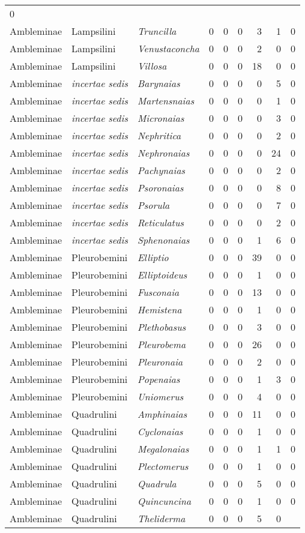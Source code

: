 \documentclass[11pt]{article}
\begin{document}
\begin{longtable}[l]{@{}lllrrrrrr@{}}
0\tabularnewline
Ambleminae & Lampsilini & \textit{Truncilla} & 0 & 0 & 0 & 3 & 1 &
0\tabularnewline
Ambleminae & Lampsilini & \textit{Venustaconcha} & 0 & 0 & 0 & 2 & 0 &
0\tabularnewline
Ambleminae & Lampsilini & \textit{Villosa} & 0 & 0 & 0 & 18 & 0 &
0\tabularnewline
Ambleminae & \textit{incertae sedis} & \textit{Barynaias} & 0 & 0 & 0 & 0 &
5 & 0\tabularnewline
Ambleminae & \textit{incertae sedis} & \textit{Martensnaias} & 0 & 0 & 0 & 0
& 1 & 0\tabularnewline
Ambleminae & \textit{incertae sedis} & \textit{Micronaias} & 0 & 0 & 0 & 0 &
3 & 0\tabularnewline
Ambleminae & \textit{incertae sedis} & \textit{Nephritica} & 0 & 0 & 0 & 0 &
2 & 0\tabularnewline
Ambleminae & \textit{incertae sedis} & \textit{Nephronaias} & 0 & 0 & 0 & 0
& 24 & 0\tabularnewline
Ambleminae & \textit{incertae sedis} & \textit{Pachynaias} & 0 & 0 & 0 & 0 &
2 & 0\tabularnewline
Ambleminae & \textit{incertae sedis} & \textit{Psoronaias} & 0 & 0 & 0 & 0 &
8 & 0\tabularnewline
Ambleminae & \textit{incertae sedis} & \textit{Psorula} & 0 & 0 & 0 & 0 & 7
& 0\tabularnewline
Ambleminae & \textit{incertae sedis} & \textit{Reticulatus} & 0 & 0 & 0 & 0
& 2 & 0\tabularnewline
Ambleminae & \textit{incertae sedis} & \textit{Sphenonaias} & 0 & 0 & 0 & 1
& 6 & 0\tabularnewline
Ambleminae & Pleurobemini & \textit{Elliptio} & 0 & 0 & 0 & 39 & 0 &
0\tabularnewline
Ambleminae & Pleurobemini & \textit{Elliptoideus} & 0 & 0 & 0 & 1 & 0 &
0\tabularnewline
Ambleminae & Pleurobemini & \textit{Fusconaia} & 0 & 0 & 0 & 13 & 0 &
0\tabularnewline
Ambleminae & Pleurobemini & \textit{Hemistena} & 0 & 0 & 0 & 1 & 0 &
0\tabularnewline
Ambleminae & Pleurobemini & \textit{Plethobasus} & 0 & 0 & 0 & 3 & 0 &
0\tabularnewline
Ambleminae & Pleurobemini & \textit{Pleurobema} & 0 & 0 & 0 & 26 & 0 &
0\tabularnewline
Ambleminae & Pleurobemini & \textit{Pleuronaia} & 0 & 0 & 0 & 2 & 0 &
0\tabularnewline
Ambleminae & Pleurobemini & \textit{Popenaias} & 0 & 0 & 0 & 1 & 3 &
0\tabularnewline
Ambleminae & Pleurobemini & \textit{Uniomerus} & 0 & 0 & 0 & 4 & 0 &
0\tabularnewline
Ambleminae & Quadrulini & \textit{Amphinaias} & 0 & 0 & 0 & 11 & 0 &
0\tabularnewline
Ambleminae & Quadrulini & \textit{Cyclonaias} & 0 & 0 & 0 & 1 & 0 &
0\tabularnewline
Ambleminae & Quadrulini & \textit{Megalonaias} & 0 & 0 & 0 & 1 & 1 &
0\tabularnewline
Ambleminae & Quadrulini & \textit{Plectomerus} & 0 & 0 & 0 & 1 & 0 &
0\tabularnewline
Ambleminae & Quadrulini & \textit{Quadrula} & 0 & 0 & 0 & 5 & 0 &
0\tabularnewline
Ambleminae & Quadrulini & \textit{Quincuncina} & 0 & 0 & 0 & 1 & 0 &
0\tabularnewline
Ambleminae & Quadrulini & \textit{Theliderma} & 0 & 0 & 0 & 5 & 0 &

\end{longtable}
\end{document}
